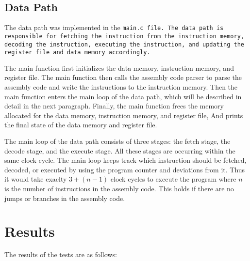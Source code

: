 \documentclass[a4paper,12pt]{article}
\begin{document}
	\subsection{Data Path}
		\par{
			The data path was implemented in the \tt{main.c} file. The data path
			is responsible for fetching the instruction from the instruction memory,
			decoding the instruction, executing the instruction, and updating the
			register file and data memory accordingly.
		}
		\par{
			The main function first initializes the data memory, instruction memory,
			and register file. The main function then calls the assembly code parser
			to parse the assembly code and write the instructions to the instruction
			memory. Then the main function enters the main loop of the data path, which will
			be described in detail in the next paragraph. Finally, the main function
			frees the memory allocated for the data memory, instruction memory, and
			register file, And prints the final state of the data memory and register
			file.
		}
		\par{
			The main loop of the data path consists of three stages: the fetch stage,
			the decode stage, and the execute stage. All these stages are occurring
			within the same clock cycle. The main loop keeps track which instruction
			should be fetched, decoded, or executed by using the program counter and
			deviations from it. Thus it would take exaclty $3 + (n - 1)$ clock cycles
			to execute the program where $n$ is the number of instructions in the
			assembly code. This holds if there are no jumps or branches in the
			assembly code.
		}


\section{Results}
	\par{
		The results of the tests are as follows:
	}
\end{document}
